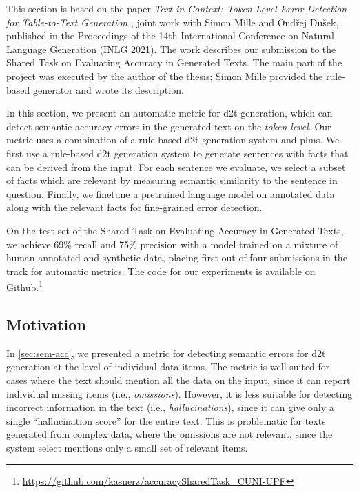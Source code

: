 \begin{refbox}
    This section is based on the paper \emph{Text-in-Context: Token-Level Error Detection for Table-to-Text Generation} \cite{kasnerTextinContextTokenLevelError2021}, joint work with Simon Mille and Ondřej Dušek, published in the Proceedings of the 14th International Conference on Natural Language Generation (INLG 2021). The work describes our submission to the Shared Task on Evaluating Accuracy in Generated Texts. The main part of the project was executed by the author of the thesis; Simon Mille provided the rule-based generator and wrote its description.
\end{refbox}


In this section, we present an automatic metric for \ac{d2t} generation, which can detect semantic accuracy errors in the generated text on the \emph{token level}. Our metric uses a combination of a rule-based \ac{d2t} generation system and \acp{plm}. We first use a rule-based \ac{d2t} generation system to generate sentences with facts that can be derived from the input. For each sentence we evaluate, we select a subset of facts which are relevant by measuring semantic similarity to the sentence in question. Finally, we finetune a pretrained language model on annotated data along with the relevant facts for fine-grained error detection.

On the test set of the Shared Task on Evaluating Accuracy in Generated Texts, we achieve 69\% recall and 75\% precision with a model trained on a mixture of human-annotated and synthetic data, placing first out of four submissions in the track for automatic metrics. The code for our experiments is available on Github.\footnote{\url{https://github.com/kasnerz/accuracySharedTask_CUNI-UPF}}


\subsection{Motivation}
\label{sec:tok-acc:motivation}


In \autoref{sec:sem-acc}, we presented a metric for detecting semantic errors for \ac{d2t} generation at the level of individual data items. The metric is well-suited for cases where the text should mention all the data on the input, since it can report individual missing items (i.e., \emph{omissions}). However, it is less suitable for detecting incorrect information in the text (i.e., \emph{hallucinations}), since it can give only a single ``hallucination score'' for the entire text. This is problematic for texts generated from complex data, where the omissions are not relevant, since the system select mentions only a small set of relevant items.


